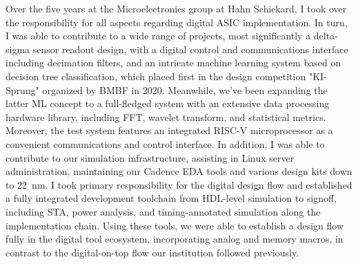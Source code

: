 Over the five years at the Microelectronics group at Hahn Schickard, I took over the responsibility for all aspects regarding digital ASIC implementation. In turn, I was able to contribute to a wide range of projects, most significantly a delta-sigma sensor readout design, with a digital control and communications interface including decimation filters, and an intricate machine learning system based on decision tree classification, which placed first in the design competition "KI-Sprung" organized by BMBF in 2020. Meanwhile, we've been expanding the latter ML concept to a full-fledged system with an extensive data processing hardware library, including FFT, wavelet transform, and statistical metrics. Moreover, the test system features an integrated RISC-V microprocessor as a convenient communications and control interface. In addition, I was able to contribute to our simulation infrastructure, assisting in Linux server administration, maintaining our Cadence EDA tools and various design kits down to \SI{22}{\nano\metre}. I took primary responsibility for the digital design flow and established a fully integrated development toolchain from HDL-level simulation to signoff, including STA, power analysis, and timing-annotated simulation along the implementation chain. Using these tools, we were able to establish a design flow fully in the digital tool ecosystem, incorporating analog and memory macros, in contrast to the digital-on-top flow our institution followed previously.\par

